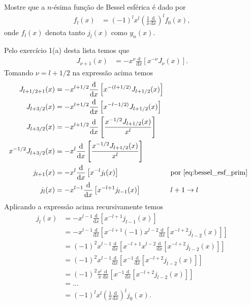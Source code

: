 \documentclass[a4paper,12pt, leqno, answers]{exam}
\begin{document}
\begin{questions}
    \question Mostre que a $n$-\'{e}sima fun\c{c}\~{a}o de Bessel esf\'{e}rica \'{e} dado por
    \begin{align*}
        f_l(x) &= (-1)^l x^l \left( \frac{1}{x} \frac{\mathrm{d}}{\mathrm{d}x} \right)^l f_0(x),
    \end{align*}
    onde $f_l(x)$ denota tanto $j_l(x)$ como $y_n(x)$.
    \begin{solution}
        Pelo exerc\'{i}cio 1(a) desta lista temos que
        \begin{align*}
            J_{\nu + 1}(x) &= -x^\nu \frac{\mathrm{d}}{\mathrm{d}x} \left[ x^{-\nu} J_\nu(x) \right].
        \end{align*}
        Tomando $\nu = l + 1/2$ na express\~{a}o acima temos
        \begin{align*}
            J_{l + 1/2 + 1}(x) &= -x^{l + 1/2} \frac{\mathrm{d}}{\mathrm{d}x} \left[ x^{-(l + 1/2)} J_{l + 1/2}(x) \right] \\
            J_{l + 3/2}(x) &= -x^{l + 1/2} \frac{\mathrm{d}}{\mathrm{d}x} \left[ x^{-l - 1/2)} J_{l + 1/2}(x) \right] \\
            J_{l + 3/2}(x) &= - x^{l + 1/2} \frac{\mathrm{d}}{\mathrm{d}x} \left[ \frac{x^{-1/2} J_{l + 1/2}(x)}{x^l} \right] \\
            x^{-1/2} J_{l + 3/2}(x) &= - x^l \frac{\mathrm{d}}{\mathrm{d}x} \left[ \frac{x^{-1/2} J_{l + 1/2}(x)}{x^l} \right] \\
            j_{l + 1}(x) &= - x^l \frac{\mathrm{d}}{\mathrm{d}x} \left[ x^{-l} j_{l}(x) \right] && \text{por \eqref{eq:bessel_esf_prim}} \\
            j_{l}(x) &= - x^{l - 1} \frac{\mathrm{d}}{\mathrm{d}x} \left[ x^{-l + 1} j_{l - 1}(x) \right] && l + 1 \to l 
        \end{align*}
        Aplicando a express\~{a}o acima recursivamente temos
        \begin{align*}
            j_{l}(x) &= - x^{l - 1} \frac{\mathrm{d}}{\mathrm{d}x} \left[ x^{-l + 1} j_{l - 1}(x) \right] \\
            &= - x^{l - 1} \frac{\mathrm{d}}{\mathrm{d}x} \left[ x^{-l + 1} (-1) x^{l - 2} \frac{\mathrm{d}}{\mathrm{d}x} \left[ x^{-l + 2} j_{l - 2}(x) \right] \right] \\
            &= (-1)^2 x^{l - 1} \frac{\mathrm{d}}{\mathrm{d}x} \left[ x^{-l + 1} x^{l - 2} \frac{\mathrm{d}}{\mathrm{d}x} \left[ x^{-l + 2} j_{l - 2}(x) \right] \right] \\
            &= (-1)^2 x^{l - 1} \frac{\mathrm{d}}{\mathrm{d}x} \left[ x^{-1} \frac{\mathrm{d}}{\mathrm{d}x} \left[ x^{-l + 2} j_{l - 2}(x) \right] \right] \\
            &= (-1)^2 \frac{x^l}{x} \frac{\mathrm{d}}{\mathrm{d}x} \left[ x^{-1} \frac{\mathrm{d}}{\mathrm{d}x} \left[ x^{-l + 2} j_{l - 2}(x) \right] \right] \\
            &= \ldots \\
            &= (-1)^l x^l \left( \frac{1}{x} \frac{\mathrm{d}}{\mathrm{d}x} \right)^l j_0(x).
        \end{align*}


\end{solution}
\end{questions}
\end{document}

